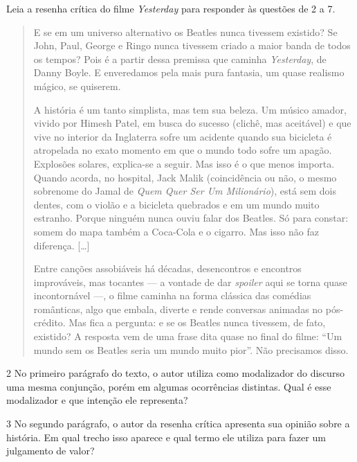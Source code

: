 \noindent Leia a resenha crítica do filme \emph{Yesterday} para responder às questões
de 2 a 7.


\begin{quote}
E se em um universo alternativo os Beatles nunca tivessem existido? Se
John, Paul, George e Ringo nunca tivessem criado a maior banda de todos
os tempos? Pois é a partir dessa premissa que caminha \emph{Yesterday},
de Danny Boyle. E enveredamos pela mais pura fantasia, um quase realismo
mágico, se quiserem.

A história é um tanto simplista, mas tem sua beleza. Um músico amador,
vivido por Himesh Patel, em busca do sucesso (clichê, mas aceitável) e
que vive no interior da Inglaterra sofre um acidente quando sua
bicicleta é atropelada no exato momento em que o mundo todo sofre um
apagão. Explosões solares, explica-se a seguir. Mas isso é o que menos
importa. Quando acorda, no hospital, Jack Malik (coincidência ou não, o
mesmo sobrenome do Jamal de \emph{Quem Quer Ser Um Milionário}), está
sem dois dentes, com o violão e a bicicleta quebrados e em um mundo
muito estranho. Porque ninguém nunca ouviu falar dos Beatles. Só para
constar: somem do mapa também a Coca-Cola e o cigarro. Mas isso não faz
diferença. {[}\ldots{}{]}

Entre canções assobiáveis há décadas, desencontros e encontros
improváveis, mas tocantes — a vontade de dar \emph{spoiler} aqui se
torna quase incontornável —, o filme caminha na forma clássica das
comédias românticas, algo que embala, diverte e rende conversas animadas
no pós-crédito. Mas fica a pergunta: e se os Beatles nunca tivessem, de
fato, existido? A resposta vem de uma frase dita quase no final do
filme: ``Um mundo sem os Beatles seria um mundo muito pior''. Não
precisamos disso.

\end{quote}

\num{2} No primeiro parágrafo do texto, o autor utiliza como modalizador
do discurso uma mesma conjunção, porém em algumas ocorrências distintas.
Qual é esse modalizador e que intenção ele representa?


\num{3} No segundo parágrafo, o autor da resenha crítica apresenta sua
opinião sobre a história. Em qual trecho isso aparece e qual termo ele
utiliza para fazer um julgamento de valor?

